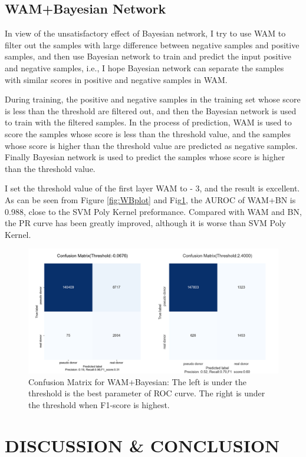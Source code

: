 \documentclass{gapd}
\begin{document}
\subsection{WAM+Bayesian Network}\label{wambayesian-network}

In view of the unsatisfactory effect of Bayesian network, I try to use
WAM to filter out the samples with large difference between negative
samples and positive samples, and then use Bayesian network to train and
predict the input positive and negative samples, i.e., I hope
Bayesian network can separate the samples with similar scores in
positive and negative samples in WAM.

During training, the positive and negative samples in the training set
whose score is less than the threshold are filtered out, and then the
Bayesian network is used to train with the filtered samples. In the
process of prediction, WAM is used to score the samples whose score is
less than the threshold value, and the samples whose score is higher
than the threshold value are predicted as negative samples. Finally
Bayesian network is used to predict the samples whose score is higher
than the threshold value.

I set the threshold value of the first layer WAM to - 3, and the result
is excellent. As can be seen from Figure \ref{fig:WBplot} and Fig\ref{fig:WBmatrix}, the AUROC of WAM+BN
is 0.988, close to the SVM Poly Kernel preformance. Compared with WAM
and BN, the PR curve has been greatly improved, although it is worse
than SVM Poly Kernel.

\begin{figure}[ht]
  \centering
  \includegraphics[width=0.8\linewidth]{assets/image-20210624154819817.png}
  \caption{Confusion Matrix for WAM+Bayesian: The left is under the
  threshold is the best parameter of ROC curve. The right is under the
  threshold when F1-score is highest.}
  \label{fig:WBmatrix}
\end{figure}

\section{DISCUSSION \& CONCLUSION}\label{discussion--conclusion}
\end{document}
